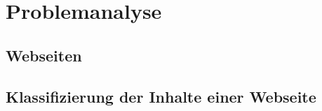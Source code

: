 \chapter{Problemanalyse}
    \label{chapter:ProblemAnalysis}
    \section{Webseiten}
    \section{\imperia}
    \section{\wordpress}
    \section{Klassifizierung der Inhalte einer Webseite}